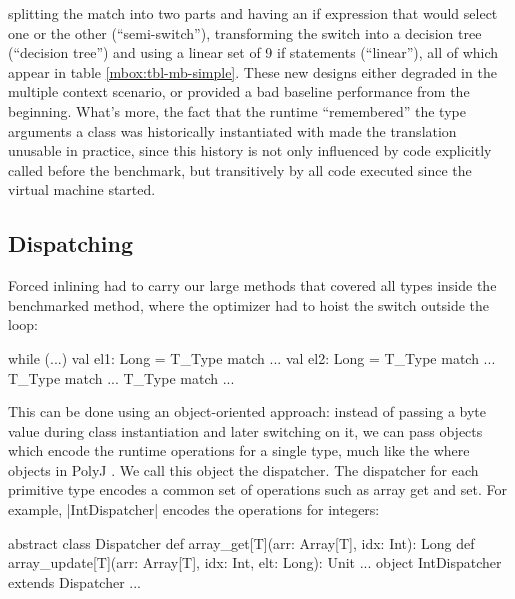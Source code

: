  splitting the match into two parts and having an if expression that would select one or the other (``semi-switch''), transforming the switch into a decision tree (``decision tree'') and using a linear set of 9 if statements (``linear''), all of which appear in table \ref{mbox:tbl-mb-simple}. These new designs either degraded in the multiple context scenario, or provided a bad baseline performance from the beginning. What's more, the fact that the runtime ``remembered'' the type arguments a class was historically instantiated with made the translation unusable in practice, since this history is not only influenced by code explicitly called before the benchmark, but transitively by all code executed since the virtual machine started. %

\subsection{Dispatching}
\label{mbox:subsec-mb-dispatching}

 Forced inlining had to carry our large methods that covered all types inside the benchmarked method, where the optimizer had to hoist the switch outside the loop:

\begin{lstlisting-nobreak}
 while (...) {
   val el1: Long = T_Type match { ... }
   val el2: Long = T_Type match { ... }
   T_Type match { ... }
   T_Type match { ... }
 }
\end{lstlisting-nobreak}

 This can be done using an object-oriented approach: instead of passing a byte value during class instantiation and later switching on it, we can pass objects which encode the runtime operations for a single type, much like the where objects in PolyJ \cite{myers-polyj}. We call this object the dispatcher. The dispatcher for each primitive type encodes a common set of operations such as array get and set. For example, |IntDispatcher| encodes the operations for integers:

\begin{lstlisting-nobreak}
 abstract class Dispatcher {
   def array_get[T](arr: Array[T], idx: Int): Long
   def array_update[T](arr: Array[T], idx: Int, elt: Long): Unit
   ...
 }
 object IntDispatcher extends Dispatcher { ... }
\end{lstlisting-nobreak}

